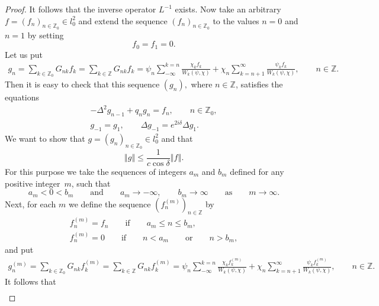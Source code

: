\documentclass[11pt]{article}
\numberwithin{equation}{section}
\begin{document}
\begin{proof}
It follows that the inverse operator $L^{-1}$ exists. Now take an arbitrary $%
f=(f_{n})_{n\in
\mathbb{Z}
_{0}}\in l_{0}^{2}$ and extend the sequence $(f_{n})_{n\in
\mathbb{Z}
_{0}}$ to the values $n=0$ and $n=1$ by setting%
\begin{equation*}
f_{0}=f_{1}=0.  %
\end{equation*}%
Let us put%
\begin{gather}
g_{n}=\sum_{k\in
\mathbb{Z}
_{0}}G_{nk}f_{k}=\sum_{k\in
\mathbb{Z}
}G_{nk}f_{k}
=\psi _{n}\sum_{-\infty }^{k=n}\frac{\chi _{k}f_{k}}{W_{k}(\psi ,\chi )}%
+\chi _{n}\sum_{k=n+1}^{\infty }\frac{\psi _{k}f_{k}}{W_{k}(\psi ,\chi )},\qquad
n\in
\mathbb{Z}
.  \label{6.14}
\end{gather}%
Then it is easy to check that this sequence $(g_{n}),$ where $n\in
\mathbb{Z}
$, satisf\/ies the equations%
\begin{gather}
-\Delta ^{2}g_{n-1}+q_{n}g_{n}=f_{n},\qquad n\in
\mathbb{Z}
_{0},  \label{6.15}
\\
g_{-1}=g_{1},\qquad \Delta g_{-1}=e^{2i\delta }\Delta g_{1}.
\label{6.16}
\end{gather}%
We want to show that $g=(g_{n})_{n\in
\mathbb{Z}
_{0}}\in l_{0}^{2}$ and that%
\begin{equation}
\left\Vert g\right\Vert \leq \frac{1}{c\cos \delta }\left\Vert f\right\Vert .
\label{6.17}
\end{equation}%
For this purpose we take the sequences of integers $a_{m}$ and $b_{m}$
def\/ined for any positive integer~$m$, such that%
\[
a_{m}<0<b_{m}\qquad \text{and} \qquad a_{m}\rightarrow -\infty ,\qquad
b_{m}\rightarrow \infty \qquad \text{as} \qquad m\rightarrow \infty .
\]%
Next, for each $m$ we def\/ine the sequence $(f_{n}^{(m)})_{n\in
\mathbb{Z}
}$ by%
\begin{gather}
f_{n}^{(m)}=f_{n}\qquad \text{if} \qquad a_{m}\leq n\leq b_{m},  \label{6.18}
\\
f_{n}^{(m)}=0 \qquad \text{if} \qquad n<a_{m} \qquad \text{or} \qquad n>b_{m},  \label{6.19}
\end{gather}%
and put%
\begin{gather*}
g_{n}^{(m)}=\sum_{k\in
\mathbb{Z}
_{0}}G_{nk}f_{k}^{(m)}=\sum_{k\in
\mathbb{Z}
}G_{nk}f_{k}^{(m)}
=\psi _{n}\sum_{-\infty }^{k=n}\frac{\chi _{k}f_{k}^{(m)}}{W_{k}(\psi ,\chi )%
}+\chi _{n}\sum_{k=n+1}^{\infty }\frac{\psi _{k}f_{k}^{(m)}}{W_{k}(\psi
,\chi )},\qquad n\in \mathbb{Z}
.  %
\end{gather*}%
It follows that%
\begin{gather}

\end{gather}
\end{proof}
\end{document}
